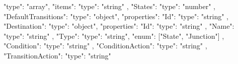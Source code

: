 \documentclass{article}
\begin{document}
{{{{{{{{{{{                                        "type": "array",
                                        "items": {
                                            "type": "string"
                                        }
                                    },
                                    "States": {
                                        "type": "number"
                                    },
                                    "DefaultTransitions": {
                                        "type": "object",
                                        "properties": {
                                            "Id": {
                                                "type": "string"
                                            },
                                            "Destination": {
                                                "type": "object",
                                                "properties": {
                                                    "Id": {
                                                        "type": "string"
                                                    },
                                                    "Name": {
                                                        "type": "string"
                                                    },                                            
                                                    "Type": {
                                                        "type": "string",
                                                        "enum": ["State", "Junction"]
                                                    }                                            
                                                }
                                            },
                                            "Condition":{
                                                "type": "string"
                                            },
                                            "ConditionAction":{
                                                "type": "string"
                                            },                  
                                            "TransitionAction":{
                                                "type": "string"                   
                                            }                                      
                                        }
                                    }
                                }                  
                            }                                                                                 
}}}}}}}}
\end{document}

